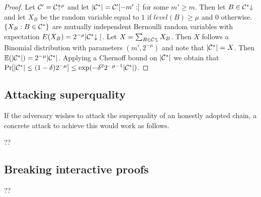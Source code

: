 \begin{proof} Let $\mathcal{C}' = \mathcal{C}\negthickspace\uparrow^\mu$ and let $|\mathcal{C}^*| =
\mathcal{C}'[-m':]$ for some $m' \geq m$. Then let $B \in \mathcal{C}^*\negthickspace\downarrow$ and let
$X_B$ be the random variable equal to $1$ if $\textit{level}(B) \geq \mu$ and
$0$ otherwise. $\{ X_B: B \in \mathcal{C}^* \}$ are mutually independent Bernoulli
random variables with expectation $E(X_B) = 2^{-\mu}|\mathcal{C}^*\negthickspace\downarrow|$. Let
$X = \sum_{B \in \mathcal{C}^*\negthickspace\downarrow}{X_B}$. Then $X$ follows a Binomial
distribution with parameters $(m', 2^{-\mu})$ and note that $|\mathcal{C}^*| = X$.
Then $\mathbb{E}(|\mathcal{C}^*|) = 2^{-\mu}|\mathcal{C}^*|$. Applying a Chernoff bound on
$|\mathcal{C}^*|$ we obtain that $\Pr[|\mathcal{C}^*| \leq (1 - \delta)2^{-\mu}] \leq
\exp(-\delta^2 2^{-\mu-1}|\mathcal{C}^*|)$.
\end{proof}

\subsection{Attacking superquality}

If the adversary wishes to attack the superquality of an honestly adopted chain, a concrete attack to achieve this would work as follows.

??

\subsection{Breaking interactive proofs}

??
